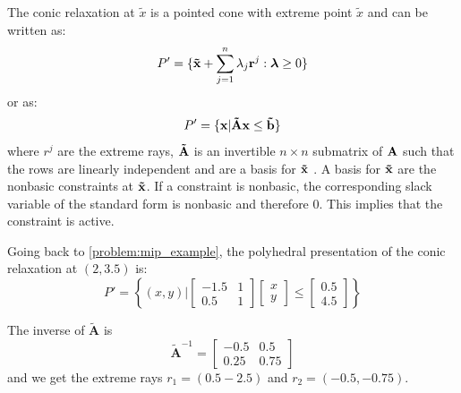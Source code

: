The conic relaxation at $\tilde x$ is a pointed cone with extreme point $\tilde x$ and can be written as: 
\begin{equation} \label{Eq:conic_relaxation}
    P' = \{ \bold{\tilde x} + \sum_{j=1}^n \lambda_j \bold r^j : \boldsymbol \lambda \geq 0 \}
\end{equation}
or as:
\begin{equation} \label{Eq:conic_relaxation_polyhedral}
    P' = \{\bold x|\bold{\tilde Ax} \leq \bold{\tilde b}\}
\end{equation} 
where $r^j$ are the extreme rays, $\bold{\tilde A}$ is an invertible $n\times n$ submatrix of $ \bold A$ such that the rows are linearly independent and are a basis for $\bold{\tilde x}$ \cite{bienstock_outer_product_free_sets}. 
A basis for $\bold{\tilde x}$ are the nonbasic constraints at $\bold{\tilde x}$.
If a constraint is nonbasic, the corresponding slack variable of the standard form is nonbasic and therefore 0. This implies that the constraint is active. 

Going back to \cref{problem:mip_example}, the polyhedral presentation of the conic relaxation at $(2, 3.5)$ is:
\begin{equation*}
    P' =     
    \left\{ (x,y) \Bigg|
        \left[ \begin{array}{cc}
            -1.5 & 1 \\
            0.5 & 1
        \end{array}\right]
        \left[ \begin{array}{c}
            x \\ y
        \end{array} \right] \leq
        \left[ \begin{array}{c}
            0.5 \\ 4.5
        \end{array} \right] 
    \right\}
\end{equation*}

The inverse of $\boldsymbol{\tilde A}$ is 
\begin{equation*}
    \boldsymbol{\tilde A}^{-1} =     
        \left[ \begin{array}{cc}
            -0.5 & 0.5 \\
            0.25 & 0.75
        \end{array}\right]
\end{equation*}
and we get the extreme rays $r_1 = (0.5 -2.5)$ and $r_2= (-0.5, -0.75)$.


